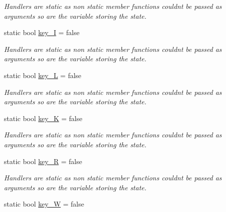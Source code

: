 \begin{DoxyCompactItemize}
\begin{DoxyCompactList}\small\item\em Handlers are static as non static member functions couldn\textquotesingle{}t be passed as arguments so are the variable storing the state. \end{DoxyCompactList}\item 
static bool \hyperlink{classcft_1_1Crafter_afe83086cdb6ea720b2126d642e4018fe}{key\+\_\+I} = false\hypertarget{classcft_1_1Crafter_afe83086cdb6ea720b2126d642e4018fe}{}\label{classcft_1_1Crafter_afe83086cdb6ea720b2126d642e4018fe}

\begin{DoxyCompactList}\small\item\em Handlers are static as non static member functions couldn\textquotesingle{}t be passed as arguments so are the variable storing the state. \end{DoxyCompactList}\item 
static bool \hyperlink{classcft_1_1Crafter_ae28043611771b66238001adb88466b2d}{key\+\_\+L} = false\hypertarget{classcft_1_1Crafter_ae28043611771b66238001adb88466b2d}{}\label{classcft_1_1Crafter_ae28043611771b66238001adb88466b2d}

\begin{DoxyCompactList}\small\item\em Handlers are static as non static member functions couldn\textquotesingle{}t be passed as arguments so are the variable storing the state. \end{DoxyCompactList}\item 
static bool \hyperlink{classcft_1_1Crafter_a66d84d75359750f76edc2e57cacd0e17}{key\+\_\+K} = false\hypertarget{classcft_1_1Crafter_a66d84d75359750f76edc2e57cacd0e17}{}\label{classcft_1_1Crafter_a66d84d75359750f76edc2e57cacd0e17}

\begin{DoxyCompactList}\small\item\em Handlers are static as non static member functions couldn\textquotesingle{}t be passed as arguments so are the variable storing the state. \end{DoxyCompactList}\item 
static bool \hyperlink{classcft_1_1Crafter_ac55c5f1123a89784119179de05b1db99}{key\+\_\+R} = false\hypertarget{classcft_1_1Crafter_ac55c5f1123a89784119179de05b1db99}{}\label{classcft_1_1Crafter_ac55c5f1123a89784119179de05b1db99}

\begin{DoxyCompactList}\small\item\em Handlers are static as non static member functions couldn\textquotesingle{}t be passed as arguments so are the variable storing the state. \end{DoxyCompactList}\item 
static bool \hyperlink{classcft_1_1Crafter_ae75a4e2b8670355dd0a008f79297efad}{key\+\_\+W} = false\hypertarget{classcft_1_1Crafter_ae75a4e2b8670355dd0a008f79297efad}{}\label{classcft_1_1Crafter_ae75a4e2b8670355dd0a008f79297efad}


\end{DoxyCompactItemize}
